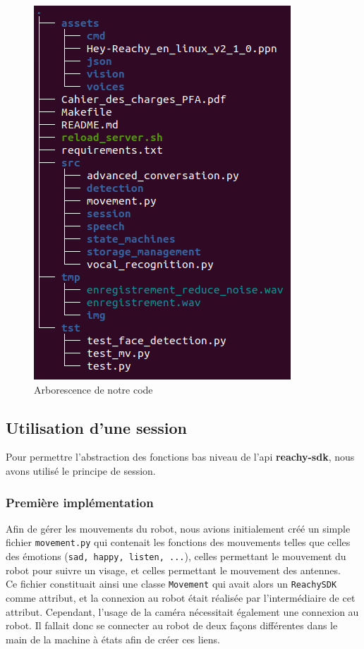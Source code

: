 \documentclass[a4paper,french]{article}
\begin{document}
\begin{figure}[H]
    \centering
    \includegraphics[scale = 0.5]{figures/tree_pfa.png}
    \caption{Arborescence de notre code}
    \label{fig:tree}
\end{figure}

\subsection{Utilisation d'une session} \label{section_session}
Pour permettre l'abstraction des fonctions bas niveau de l'api \textbf{reachy-sdk}, nous avons utilisé le principe de session.
\subsubsection{Première implémentation}
Afin de gérer les mouvements du robot, nous avions initialement créé un simple fichier \texttt{movement.py} qui contenait les fonctions des mouvements telles que celles des émotions (\texttt{sad, happy, listen, ...}), celles permettant le mouvement du robot pour suivre un visage, et celles permettant le mouvement des antennes. \\

Ce fichier constituait ainsi une classe \texttt{Movement} qui avait alors un \texttt{ReachySDK} comme attribut, et la connexion au robot était réalisée par l'intermédiaire de cet attribut. Cependant, l'usage de la caméra nécessitait également une connexion au robot. Il fallait donc se connecter au robot de deux façons différentes dans le main de la machine à états afin de créer ces liens.
\end{document}

